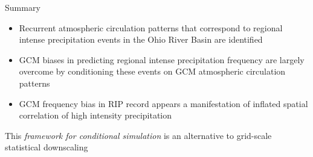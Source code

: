 \begin{block}{Summary}
  \begin{itemize}
    \item Recurrent atmospheric circulation patterns that correspond to regional intense precipitation events in  the Ohio River Basin are identified
    \item GCM biases in predicting regional intense precipitation frequency are largely overcome by conditioning these events on GCM atmospheric circulation patterns
    \item GCM frequency bias in RIP record appears a manifestation of inflated spatial correlation of high intensity precipitation
  \end{itemize}
  This \emph{framework for conditional simulation} is an alternative to grid-scale statistical downscaling
\end{block}

